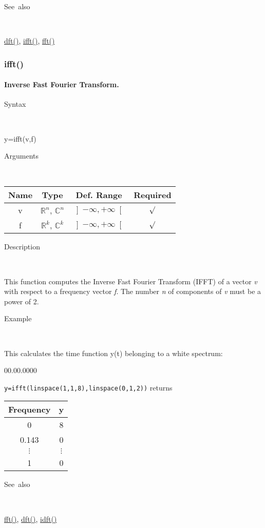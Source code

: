 \begin{description}
\item [See~also]~
\end{description}
\textcolor{blue}{\hyperlink{dft}{dft()}}\textcolor{black}{,} \textcolor{blue}{\hyperlink{ifft}{ifft()}}\textcolor{black}{,}
\textcolor{blue}{\hyperlink{fft}{fft()}}


\newpage
\subsubsection*{\hypertarget{ifft}{}{\Large ifft()}}


\paragraph{\label{par:Inverse-Fast-Fourier}Inverse Fast Fourier Transform.}

\begin{description}
\item [Syntax]~
\end{description}
y=ifft(v,f)

\begin{description}
\item [Arguments]~
\end{description}
\begin{tabular}{|c|c|c|c|}
\hline 
Name&
Type&
Def. Range&
Required\tabularnewline
\hline
\hline 
v&
$\mathbb{R}^{n}$, $\mathbb{C}^{n}$&
$\left]-\infty,+\infty\right[$&
$\surd$\tabularnewline
\hline 
f&
$\mathbb{R}^{k}$, $\mathbb{C}^{k}$&
$\left]-\infty,+\infty\right[$&
$\surd$\tabularnewline
\hline
\end{tabular}

\begin{description}
\item [Description]~
\end{description}
This function computes the Inverse Fast Fourier Transform (IFFT) of
a vector \textit{v} with respect to a frequency vector \textit{f}.
The number \textit{n} of components of \textit{v} must be a power
of 2.

\begin{description}
\item [Example]~
\end{description}
This calculates the time function y(t) belonging to a white spectrum:

\begin{lyxlist}{00.00.0000}
\item [\texttt{y=ifft(linspace(1,1,8),linspace(0,1,2))}]returns \begin{tabular}{|c|c|}
\hline 
Frequency&
y\tabularnewline
\hline
\hline 
0&
8\tabularnewline
\hline 
0.143&
0\tabularnewline
\hline 
$\vdots$&
$\vdots$\tabularnewline
\hline 
1&
0\tabularnewline
\hline
\end{tabular}
\end{lyxlist}
\begin{description}
\item [See~also]~
\end{description}
\textcolor{blue}{\hyperlink{fft}{fft()}}\textcolor{black}{,} \textcolor{blue}{\hyperlink{dft}{dft()}}\textcolor{black}{,}
\textcolor{blue}{\hyperlink{idft}{idft()}}


